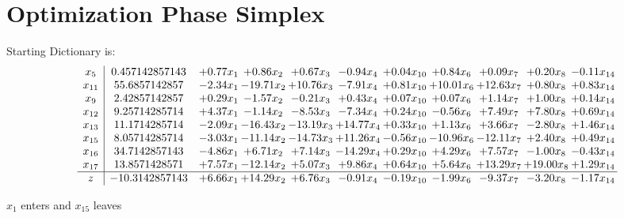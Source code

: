 \documentclass[9pt]{article}
\begin{document}
\section{Optimization Phase Simplex}
Starting Dictionary is:
\[\begin{array}{c| c c@{\hskip 2pt} c@{\hskip 2pt} c@{\hskip 2pt} c@{\hskip 2pt} c@{\hskip 2pt} c@{\hskip 2pt} c@{\hskip 2pt} c@{\hskip 2pt} c@{\hskip 2pt} }
 x_{5}   &  0.457142857143 & +  0.77 x_{1} & +  0.86 x_{2} & +  0.67 x_{3} & -0.94 x_{4} & +  0.04 x_{10} & +  0.84 x_{6} & +  0.09 x_{7} & +  0.20 x_{8} & -0.11 x_{14}\\
 x_{11}   &  55.6857142857 & -2.34 x_{1} & -19.71 x_{2} & + 10.76 x_{3} & -7.91 x_{4} & +  0.81 x_{10} & + 10.01 x_{6} & + 12.63 x_{7} & +  0.80 x_{8} & +  0.83 x_{14}\\
 x_{9}   &  2.42857142857 & +  0.29 x_{1} & -1.57 x_{2} & -0.21 x_{3} & +  0.43 x_{4} & +  0.07 x_{10} & +  0.07 x_{6} & +  1.14 x_{7} & +  1.00 x_{8} & +  0.14 x_{14}\\
 x_{12}   &  9.25714285714 & +  4.37 x_{1} & -1.14 x_{2} & -8.53 x_{3} & -7.34 x_{4} & +  0.24 x_{10} & -0.56 x_{6} & +  7.49 x_{7} & +  7.80 x_{8} & +  0.69 x_{14}\\
 x_{13}   &  11.1714285714 & -2.09 x_{1} & -16.43 x_{2} & -13.19 x_{3} & + 14.77 x_{4} & +  0.33 x_{10} & +  1.13 x_{6} & +  3.66 x_{7} & -2.80 x_{8} & +  1.46 x_{14}\\
 x_{15}   &  8.05714285714 & -3.03 x_{1} & -11.14 x_{2} & -14.73 x_{3} & + 11.26 x_{4} & -0.56 x_{10} & -10.96 x_{6} & -12.11 x_{7} & +  2.40 x_{8} & +  0.49 x_{14}\\
 x_{16}   &  34.7142857143 & -4.86 x_{1} & +  6.71 x_{2} & +  7.14 x_{3} & -14.29 x_{4} & +  0.29 x_{10} & +  4.29 x_{6} & +  7.57 x_{7} & -1.00 x_{8} & -0.43 x_{14}\\
 x_{17}   &  13.8571428571 & +  7.57 x_{1} & -12.14 x_{2} & +  5.07 x_{3} & +  9.86 x_{4} & +  0.64 x_{10} & +  5.64 x_{6} & + 13.29 x_{7} & + 19.00 x_{8} & +  1.29 x_{14}\\
\hline
z    &  -10.3142857143 & +  6.66 x_{1} & + 14.29 x_{2} & +  6.76 x_{3} & -0.91 x_{4} & -0.19 x_{10} & -1.99 x_{6} & -9.37 x_{7} & -3.20 x_{8} & -1.17 x_{14}\\
\end{array}\]


 $ x_{1} $ enters and $ x_{15} $ leaves 
\end{document}
